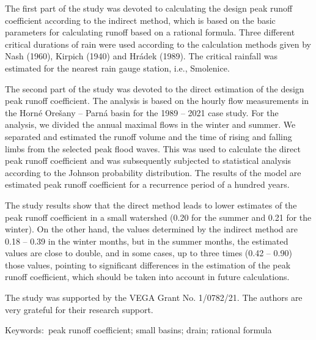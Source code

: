 The first part of the study was devoted to calculating the design peak runoff coefficient according to the indirect method, which is based on the basic parameters for calculating runoff based on a rational formula. Three different critical durations of rain were used according to the calculation methods given by Nash (1960), Kirpich (1940) and Hrádek (1989). The critical rainfall was estimated for the nearest rain gauge station, i.e., Smolenice.

The second part of the study was devoted to the direct estimation of the design peak runoff coefficient. The analysis is based on the hourly flow measurements in the Horné Orešany – Parná basin for the 1989 – 2021 case study. For the analysis, we divided the annual maximal flows in the winter and summer. We separated and estimated the runoff volume and the time of rising and falling limbs from the selected peak flood waves. This was used to calculate the direct peak runoff coefficient and was subsequently subjected to statistical analysis according to the Johnson probability distribution. The results of the model are estimated peak runoff coefficient for a recurrence period of a hundred years.

The study results show that the direct method leads to lower estimates of the peak runoff coefficient in a small watershed (0.20 for the summer and 0.21 for the winter). On the other hand, the values determined by the indirect method are 0.18 – 0.39 in the winter months, but in the summer months, the estimated values are close to double, and in some cases, up to three times (0.42 – 0.90) those values, pointing to significant differences in the estimation of the peak runoff coefficient, which should be taken into account in future calculations.

The study was supported by the VEGA Grant No. 1/0782/21. The authors are very grateful for their research support.

Keywords: peak runoff coefficient; small basins; drain; rational formula
\newpage{}
{}
\begin{flushleft}






\end{flushleft}


